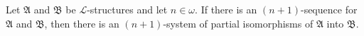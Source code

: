 Let $\mathfrak{A}$ and $\mathfrak{B}$ be $\mathcal{L}$-structures and let $n \in \omega$. If there is an $(n + 1)$-sequence for $\mathfrak{A}$ and $\mathfrak{B}$, then there is an $(n + 1)$-system of partial isomorphisms of $\mathfrak{A}$ into $\mathfrak{B}$.
